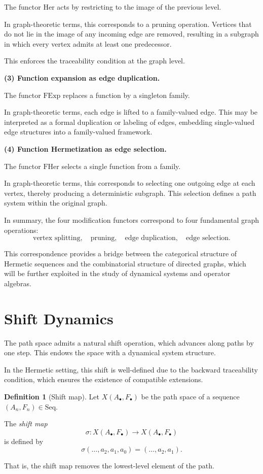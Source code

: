 \documentclass[11pt]{book}
\theoremstyle{definition}
\newtheorem{definition}{Definition}[section]
\theoremstyle{plain}
\theoremstyle{remark}
\begin{document}
The functor $\mathrm{Her}$ acts by restricting to the image of the previous level.

In graph-theoretic terms, this corresponds to a pruning operation.
Vertices that do not lie in the image of any incoming edge are removed,
resulting in a subgraph in which every vertex admits at least one predecessor.

This enforces the traceability condition at the graph level.

\medskip

\textbf{(3) Function expansion as edge duplication.}

The functor $\mathrm{FExp}$ replaces a function by a singleton family.

In graph-theoretic terms, each edge is lifted to a family-valued edge.
This may be interpreted as a formal duplication or labeling of edges,
embedding single-valued edge structures into a family-valued framework.

\medskip

\textbf{(4) Function Hermetization as edge selection.}

The functor $\mathrm{FHer}$ selects a single function from a family.

In graph-theoretic terms, this corresponds to selecting one outgoing edge at each vertex,
thereby producing a deterministic subgraph.
This selection defines a path system within the original graph.

\medskip

In summary, the four modification functors correspond to four fundamental graph operations:
\[
\text{vertex splitting}, \quad \text{pruning}, \quad \text{edge duplication}, \quad \text{edge selection}.
\]

This correspondence provides a bridge between the categorical structure of Hermetic sequences
and the combinatorial structure of directed graphs,
which will be further exploited in the study of dynamical systems and operator algebras.


\section{Shift Dynamics}
The path space admits a natural shift operation,
which advances along paths by one step.
This endows the space with a dynamical system structure.

In the Hermetic setting, this shift is well-defined
due to the backward traceability condition,
which ensures the existence of compatible extensions.
\begin{definition}[Shift map]
Let $X(A_\bullet,F_\bullet)$ be the path space of a sequence
$(A_n,F_n) \in \mathrm{Seq}$.

The \emph{shift map}
\[
\sigma : X(A_\bullet,F_\bullet) \longrightarrow X(A_\bullet,F_\bullet)
\]
is defined by
\[
\sigma(\ldots,a_2,a_1,a_0) = (\ldots,a_2,a_1).
\]

That is, the shift map removes the lowest-level element of the path.
\end{definition}
\end{document}
